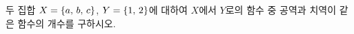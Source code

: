 \hspace*{2mm}\begin{minipage}[t]{\dimexpr\linewidth-2mm\relax}\vspace{0pt}
두 집합 $X=\{a,\mkern3mu b,\mkern3mu c\}$, $Y=\{1,\mkern3mu 2\}$에 대하여 $X$에서 $Y$로의 함수 중 공역과 치역이 같은 함수의 개수를 구하시오.\end{minipage}
